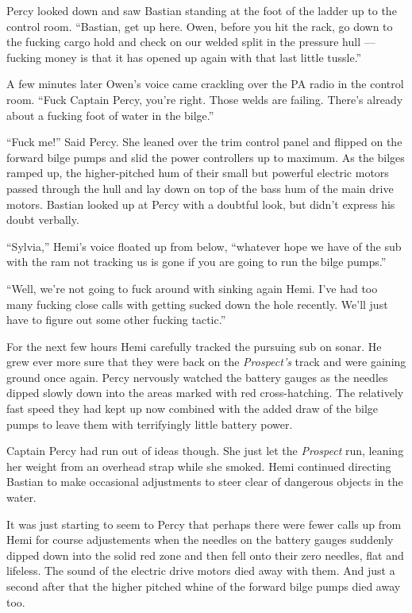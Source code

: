 \documentclass[]{scrbook}
\begin{document}
Percy looked down and saw Bastian standing at the foot of the ladder up
to the control room. ``Bastian, get up here. Owen, before you hit the
rack, go down to the fucking cargo hold and check on our welded split in
the pressure hull --- fucking money is that it has opened up again with
that last little tussle.''

A few minutes later Owen's voice came crackling over the PA radio in the
control room. ``Fuck Captain Percy, you're right. Those welds are
failing. There's already about a fucking foot of water in the bilge.''

``Fuck me!'' Said Percy. She leaned over the trim control panel and
flipped on the forward bilge pumps and slid the power controllers up to
maximum. As the bilges ramped up, the higher-pitched hum of their small
but powerful electric motors passed through the hull and lay down on top
of the bass hum of the main drive motors. Bastian looked up at Percy
with a doubtful look, but didn't express his doubt verbally.

``Sylvia,'' Hemi's voice floated up from below, ``whatever hope we have
of the sub with the ram not tracking us is gone if you are going to run
the bilge pumps.''

``Well, we're not going to fuck around with sinking again Hemi. I've had
too many fucking close calls with getting sucked down the hole recently.
We'll just have to figure out some other fucking tactic.''

For the next few hours Hemi carefully tracked the pursuing sub on sonar.
He grew ever more sure that they were back on the \emph{Prospect's}
track and were gaining ground once again. Percy nervously watched the
battery gauges as the needles dipped slowly down into the areas marked
with red cross-hatching. The relatively fast speed they had kept up now
combined with the added draw of the bilge pumps to leave them with
terrifyingly little battery power.

Captain Percy had run out of ideas though. She just let the
\emph{Prospect} run, leaning her weight from an overhead strap while she
smoked. Hemi continued directing Bastian to make occasional adjustments
to steer clear of dangerous objects in the water.

It was just starting to seem to Percy that perhaps there were fewer
calls up from Hemi for course adjustements when the needles on the
battery gauges suddenly dipped down into the solid red zone and then
fell onto their zero needles, flat and lifeless. The sound of the
electric drive motors died away with them. And just a second after that
the higher pitched whine of the forward bilge pumps died away too.
\end{document}
